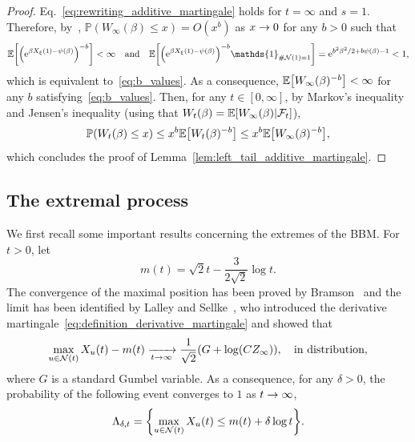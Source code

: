 \documentclass[AHL,Unicode,longabstracts,published]{cedram}
\newcommand{\e}{\mathrm{e}}
\newcommand{\E}{\mathbb{E}}
\renewcommand{\P}{\mathbb{P}}
\newcommand\1{\mathds{1}}
\newcommand{\cF}{\mathcal{F}}
\newcommand{\cN}{\mathcal{N}}
\newcommand{\Expec}[1]{\mathbb{E}\left[#1\right]}
\let\originalleft\left
\let\originalright\right
\renewcommand{\left}{\mathopen{}\mathclose\bgroup\originalleft}
\renewcommand{\right}{\aftergroup\egroup\originalright}
\renewcommand*{\to}{\mathchoice{\longrightarrow}{\rightarrow}{\rightarrow}{\rightarrow}}
\begin{document}
\begin{proof}
Eq.~\eqref{eq:rewriting_additive_martingale} holds for $t = \infty$ and $s = 1$. Therefore, by~\cite[Theorem~2.4]{Liu2001}, $\P(W_\infty(\beta) \leq x) = O(x^b)$ as $x \to 0$ for any $b>0$ such that
\begin{equation*}
\E \left[\left(\e^{\beta X_\xi(1) - \psi(\beta)} \right)^{-b} \right] < \infty \quad \text{and} \quad \E \left[\left(\e^{\beta X_\xi(1) - \psi(\beta)} \right)^{-b} \1_{\# \cN(1) = 1} \right] = \e^{b^2 \beta^2/2 + b \psi(\beta) - 1} < 1,
\end{equation*}
which is equivalent to~\eqref{eq:b_values}. As a consequence, $\Expec{W_\infty(\beta)^{-b}} < \infty$ for any $b$ satisfying~\eqref{eq:b_values}. Then, for any $t \in [0, \infty]$, by Markov's inequality and Jensen's inequality (using that $W_t(\beta) = \E \left[W_\infty(\beta) \middle| \cF_t \right]$),
\begin{equation*}
\P(W_t(\beta) \leq x) \leq x^b \Expec{W_t(\beta)^{-b}} \leq x^b \Expec{W_\infty(\beta)^{-b}},
\end{equation*}
which concludes the proof of Lemma~\ref{lem:left_tail_additive_martingale}.
\end{proof}

\subsection{The extremal process}

We first recall some important results concerning the extremes of the BBM. For $t>0$, let
\begin{equation}\label{eq:def_m(t)}
m(t) = \sqrt{2} t - \frac{3}{2 \sqrt{2}} \log t.
\end{equation}
The convergence of the maximal position has been proved by Bramson~\cite{Bramson1983} and the limit has been identified by Lalley and Sellke~\cite{LalleySellke1987}, who introduced the derivative martingale~\eqref{eq:definition_derivative_martingale} and showed that
\begin{equation}\label{eq:convergence_of_the_recentered_maximum}
\max_{u \in \cN(t)} X_u(t) - m(t) \xrightarrow[t \to \infty]{} \frac{1}{\sqrt{2}} (G + \log(CZ_\infty)), \quad \text{in distribution},
\end{equation}
where $G$ is a standard Gumbel variable. As a consequence, for any $\delta > 0$, the probability of the following event converges to $1$ as $t \to \infty$,
\begin{equation}\label{eq:bramson_estimate}
\Lambda_{\delta, t} = \left\{ \max_{u \in \cN(t)} X_u(t) \leq m(t) + \delta \log t \right\}.
\end{equation}
\end{document}

